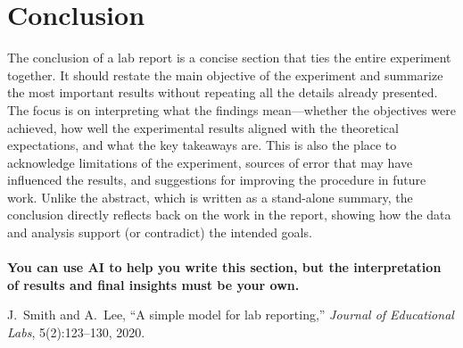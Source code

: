 \documentclass[11pt,a4paper]{article}
\begin{document}
    \section{Conclusion}
        The conclusion of a lab report is a concise section that ties the entire experiment together. It should restate the main objective of the experiment and summarize the most important results without repeating all the details already presented. The focus is on interpreting what the findings mean—whether the objectives were achieved, how well the experimental results aligned with the theoretical expectations, and what the key takeaways are. This is also the place to acknowledge limitations of the experiment, sources of error that may have influenced the results, and suggestions for improving the procedure in future work. Unlike the abstract, which is written as a stand-alone summary, the conclusion directly reflects back on the work in the report, showing how the data and analysis support (or contradict) the intended goals.
        \\\\
        \noindent \textbf{You can use AI to help you write this section, but the interpretation of results and final insights must be your own.} 
    
    \begin{thebibliography}{9}
        J.~Smith and A.~Lee, ``A simple model for lab reporting,'' \emph{Journal of Educational Labs}, 5(2):123--130, 2020.
    \end{thebibliography}
\end{document}
